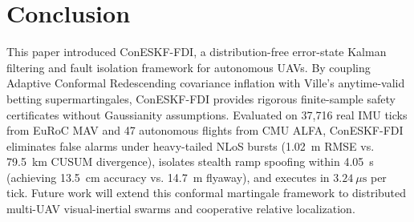 \documentclass[journal,twocolumn]{IEEEtran}
\begin{document}
\section{Conclusion}
\label{sec:conclusion}
This paper introduced ConESKF-FDI, a distribution-free error-state Kalman filtering and fault isolation framework for autonomous UAVs. By coupling Adaptive Conformal Redescending covariance inflation with Ville's anytime-valid betting supermartingales, ConESKF-FDI provides rigorous finite-sample safety certificates without Gaussianity assumptions. Evaluated on 37,716 real IMU ticks from EuRoC MAV and 47 autonomous flights from CMU ALFA, ConESKF-FDI eliminates false alarms under heavy-tailed NLoS bursts (1.02~m RMSE vs. 79.5~km CUSUM divergence), isolates stealth ramp spoofing within 4.05~s (achieving 13.5~cm accuracy vs. 14.7~m flyaway), and executes in $3.24\ \mu\text{s}$ per tick. Future work will extend this conformal martingale framework to distributed multi-UAV visual-inertial swarms and cooperative relative localization.



\end{document}
